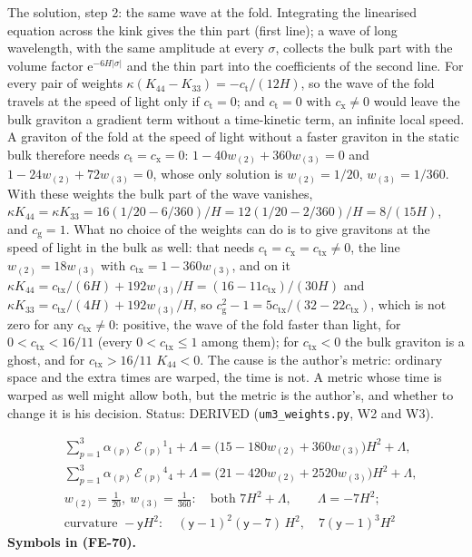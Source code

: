 \documentclass[
  10pt,
]{article}
\begin{document}
The solution, step 2: the same wave at the fold. Integrating the
linearised equation across the kink gives the thin part (first line); a
wave of long wavelength, with the same amplitude at every \(\sigma\),
collects the bulk part with the volume factor
\(\mathrm{e}^{-6H\lvert\sigma\rvert}\) and the thin part into the
coefficients of the second line. For every pair of weights
\(\kappa(K_{44} - K_{33}) = -c_{\mathrm{t}}/(12H)\), so the wave of the
fold travels at the speed of light only if \(c_{\mathrm{t}} = 0\); and
\(c_{\mathrm{t}} = 0\) with \(c_{\mathrm{x}} \ne 0\) would leave the
bulk graviton a gradient term without a time-kinetic term, an infinite
local speed. A graviton of the fold at the speed of light without a
faster graviton in the static bulk therefore needs
\(c_{\mathrm{t}} = c_{\mathrm{x}} = 0\):
\(1 - 40w_{(2)} + 360w_{(3)} = 0\) and
\(1 - 24w_{(2)} + 72w_{(3)} = 0\), whose only solution is
\(w_{(2)} = 1/20\), \(w_{(3)} = 1/360\). With these weights the bulk
part of the wave vanishes,
\(\kappa K_{44} = \kappa K_{33} = 16(1/20 - 6/360)/H = 12(1/20 - 2/360)/H = 8/(15H)\),
and \(c_{\mathrm{g}} = 1\). What no choice of the weights can do is to
give gravitons at the speed of light in the bulk as well: that needs
\(c_{\mathrm{t}} = c_{\mathrm{x}} = c_{\mathrm{tx}} \ne 0\), the line
\(w_{(2)} = 18w_{(3)}\) with \(c_{\mathrm{tx}} = 1 - 360w_{(3)}\), and
on it
\(\kappa K_{44} = c_{\mathrm{tx}}/(6H) + 192w_{(3)}/H = (16 - 11c_{\mathrm{tx}})/(30H)\)
and \(\kappa K_{33} = c_{\mathrm{tx}}/(4H) + 192w_{(3)}/H\), so
\(c_{\mathrm{g}}^2 - 1 = 5c_{\mathrm{tx}}/(32 - 22c_{\mathrm{tx}})\),
which is not zero for any \(c_{\mathrm{tx}} \ne 0\): positive, the wave
of the fold faster than light, for \(0 < c_{\mathrm{tx}} < 16/11\)
(every \(0 < c_{\mathrm{tx}} \le 1\) among them); for
\(c_{\mathrm{tx}} < 0\) the bulk graviton is a ghost, and for
\(c_{\mathrm{tx}} > 16/11\) \(K_{44} < 0\). The cause is the author's
metric: ordinary space and the extra times are warped, the time is not.
A metric whose time is warped as well might allow both, but the metric
is the author's, and whether to change it is his decision. Status:
DERIVED (\texttt{um3\_weights.py}, W2 and W3).

\[
\begin{aligned}
&\sum_{p=1}^{3}\alpha_{(p)}\,\mathcal{E}_{(p)}{}^1{}_1 + \Lambda = \big(15 - 180w_{(2)} + 360w_{(3)}\big)H^2 + \Lambda,\\
&\sum_{p=1}^{3}\alpha_{(p)}\,\mathcal{E}_{(p)}{}^4{}_4 + \Lambda = \big(21 - 420w_{(2)} + 2520w_{(3)}\big)H^2 + \Lambda,\\
&w_{(2)} = \frac{1}{20},\ w_{(3)} = \frac{1}{360}:\quad \text{both } 7H^2 + \Lambda,\qquad \Lambda = -7H^2;\\
&\text{curvature } -\mathsf{y}H^2:\quad (\mathsf{y} - 1)^2(\mathsf{y} - 7)\,H^2,\quad 7(\mathsf{y} - 1)^3H^2
\end{aligned} \tag{FE-70}
\] \textbf{Symbols in (FE-70).}
\end{document}
